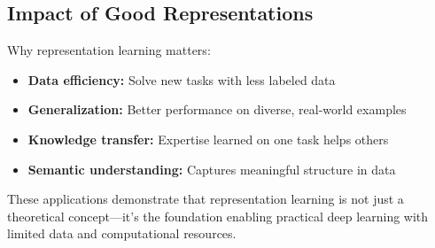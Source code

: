 \subsection{Impact of Good Representations}

Why representation learning matters:
\begin{itemize}
    \item \textbf{Data efficiency:} Solve new tasks with less labeled data
    \item \textbf{Generalization:} Better performance on diverse, real-world examples
    \item \textbf{Knowledge transfer:} Expertise learned on one task helps others
    \item \textbf{Semantic understanding:} Captures meaningful structure in data
\end{itemize}

These applications demonstrate that representation learning is not just a theoretical concept—it's the foundation enabling practical deep learning with limited data and computational resources.


